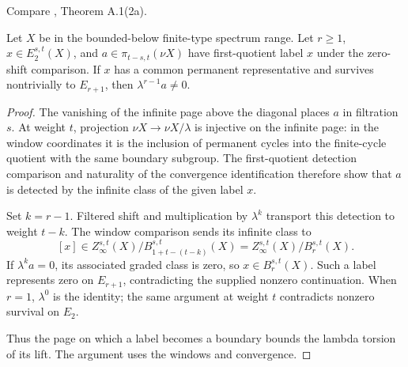 \begin{theorem}
\label{sem:Literature:complete-lifetime}
Compare \cite{BHS}, Theorem A.1(2a).\par

Let $X$ be in the bounded-below finite-type spectrum range. Let
$r\ge1$, $x\in E_2^{s,t}(X)$, and
$a\in\pi_{t-s,t}(\nu X)$ have first-quotient label $x$ under the
zero-shift comparison. If $x$ has a common permanent representative
and survives nontrivially to $E_{r+1}$, then $\lambda^{r-1}a\ne0$.

\end{theorem}
\begin{proof}
The vanishing of the infinite page above the diagonal
places $a$ in filtration $s$. At weight $t$, projection
$\nu X\to\nu X/\lambda$ is injective on the infinite page: in the
window coordinates it is the inclusion of permanent cycles into the
finite-cycle quotient with the same boundary subgroup. The
first-quotient detection comparison and naturality of the convergence
identification therefore show that $a$ is detected by the infinite
class of the given label $x$.

Set $k=r-1$. Filtered shift and multiplication by $\lambda^k$ transport
this detection to weight $t-k$. The window comparison sends its
infinite class to
\[
[x]\in Z_\infty^{s,t}(X)/B_{1+t-(t-k)}^{s,t}(X)
     =Z_\infty^{s,t}(X)/B_r^{s,t}(X).
\]
If $\lambda^k a=0$, its associated graded class is zero, so
$x\in B_r^{s,t}(X)$. Such a label represents zero on $E_{r+1}$,
contradicting the supplied nonzero continuation. When $r=1$,
$\lambda^0$ is the identity; the same argument
at weight $t$ contradicts nonzero survival on $E_2$.

Thus the page on which a label becomes a boundary bounds the lambda
torsion of its lift. The argument uses the windows and convergence.
\end{proof}

